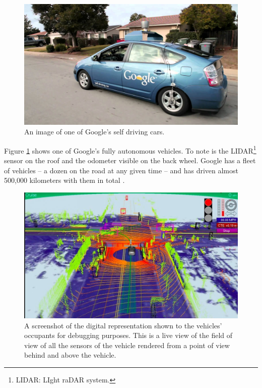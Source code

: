\documentclass{acm_proc_article-sp}
\begin{document}
\begin{figure}
	\centering
	\includegraphics[width=\columnwidth]{img/google_vehicle.jpg}
	\caption[Google Self Driving Car]{An image of one of Google's self driving cars.}
	\label{fig:google_vehicle}
\end{figure}

Figure \ref{fig:google_vehicle} shows one of Google's fully autonomous vehicles.
To note is the LIDAR\footnote{LIDAR: LIght raDAR system.} sensor on the roof and the odometer visible on the back wheel.
Google has a fleet of vehicles – a dozen on the road at any given time – and has driven almost 500,000 kilometers with them in total \cite{www:google_blog_miles}.

\begin{figure}
	\centering
	\includegraphics[width=\columnwidth]{img/google_tech_view.jpg}
	\caption[Tech View]{A screenshot of the digital representation shown to the vehicles' occupants for debugging purposes. This is a live view of the field of view of all the sensors of the vehicle rendered from a point of view behind and above the vehicle.}
	\label{fig:google_tech_view}
\end{figure}
\end{document}
